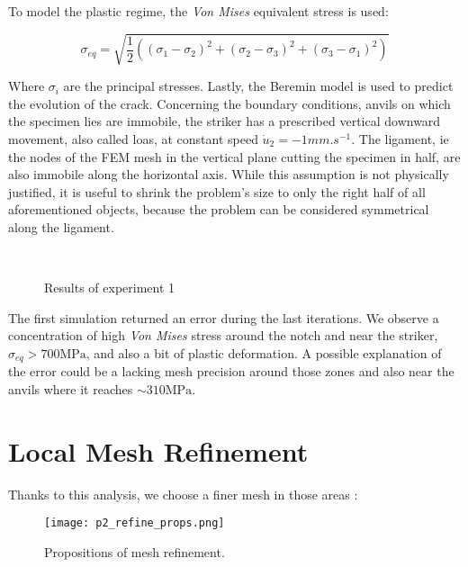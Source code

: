 \documentclass[
10pt, %
a4paper, %
oneside, %
headinclude,footinclude, %
BCOR5mm, %
]{scrartcl}
\begin{document}
To model the plastic regime, the \textit{Von Mises} equivalent stress
is used:

\begin{equation}
    \sigma_{eq} = \sqrt{\frac{1}{2}\left((\sigma_1 - \sigma_2)^2+(\sigma_2 - \sigma_3)^2+(\sigma_3 - \sigma_1)^2\right)}
\end{equation}

Where $\sigma_i$ are the principal stresses.
Lastly, the Beremin model is used to predict the evolution of the crack.
Concerning the boundary conditions, anvils on which the specimen lies
are immobile, the striker has a prescribed vertical downward movement,
also called loas, at
constant speed $\dot{u}_2 = -1 mm.s^{-1}$. The ligament, ie the nodes
of the FEM mesh in the vertical plane cutting the specimen in half, are also immobile
along the horizontal axis.
While this assumption is not physically justified, it is useful to
shrink the problem's size to only the right half of all aforementioned
objects, because the problem can be considered symmetrical along the ligament.


\begin{figure}[ht]
    \centering
    \hfill
    \\
    \hfill
    \caption{Results of experiment 1}
    \label{fig:res_exp_1}
\end{figure}

The first simulation returned an error during the last iterations.
We observe a concentration of high \textit{Von Mises} stress
around the notch and near the striker, $\sigma_{eq} > 700 \text{MPa}$, and
also a bit of
plastic deformation.
A possible explanation of the error could be a lacking mesh precision
around those zones and also near the anvils where it reaches
$\sim 310 \text{MPa}$.

\section{Local Mesh Refinement}

Thanks to this analysis, we choose a finer mesh in those areas :

\begin{figure}[h]
    \centering
    \texttt{[image: p2\_refine\_props.png]}
    \caption{Propositions of mesh refinement.}
\end{figure}
\end{document}
